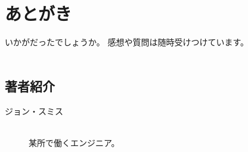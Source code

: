 \chapter{あとがき}
\label{chap:chap99-postscript}

いかがだったでしょうか。
感想や質問は随時受けつけています。
\\
\\

\section*{著者紹介}
\label{sec:-1}

\begin{description}
\item[ジョン・スミス] \mbox{} \\
某所で働くエンジニア。
\end{description}
